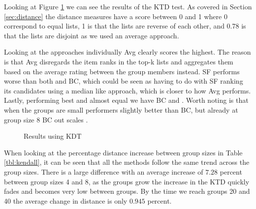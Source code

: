 Looking at Figure \ref{fig:kendalldistance} we can see the results of the KTD test. As covered in Section \ref{sec:distance} the distance measures have a score between 0 and 1 where 0 correspond to equal lists, 1 is that the lists are reverse of each other, and 0.78 is that the lists are disjoint as we used an average approach.

Looking at the approaches individually Avg clearly scores the highest. The reason is that Avg disregards the item ranks in the top-k lists and aggregates them based on the average rating between the group members instead. SF performs worse than both \MC and BC, which could be seen as having to do with SF ranking its candidates using a median like approach, which is closer to how Avg performs. Lastly, performing best and almost equal we have BC and \MC. Worth noting is that when the groups are small \MC performers slightly better than BC, but already at group size 8 BC out scales \MC.


\begin{figure}[H]
\caption{Results using KDT} \label{fig:kendalldistance}
\end{figure}
\newpage
When looking at the percentage distance increase between group sizes in Table \ref{tbl:kendall}, it can be seen that all the methods follow the same trend across the group sizes. There is a large difference with an average increase of $7.28$ percent between group sizes 4 and 8, as the groups grow the increase in the KTD quickly fades and becomes very low between groups. By the time we reach groups 20 and 40 the average change in distance is only $0.945$ percent.

